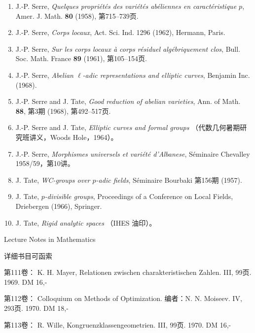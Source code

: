 \begin{enumerate}
{  groups}, Amer. J. Math. \textbf{78}, 第2期 (1956), 第401--443页.
\item[{[25bis]}] J.-P. Serre, \emph{Quelques propri\'{e}t\'{e}s des
  vari\'{e}t\'{e}s ab\'{e}liennes en caract\'{e}ristique $p$}, Amer. J.
  Math. \textbf{80} (1958), 第715--739页.
\item[{[26]}] J.-P. Serre, \emph{Corps locaux}, Act. Sci. Ind. 1296
  (1962), Hermann, Paris.
\item[{[27]}] J.-P. Serre, \emph{Sur les corps locaux \`{a} corps
  r\'{e}siduel alg\'{e}briquement clos}, Bull. Soc. Math. France
  \textbf{89} (1961), 第105--154页.
\item[{[28]}] J.-P. Serre, \emph{Abelian $\ell$-adic representations and
  elliptic curves}, Benjamin Inc. (1968).
\item[{[29]}] J.-P. Serre and J. Tate, \emph{Good reduction of abelian
  varieties}, Ann. of Math. \textbf{88}, 第3期 (1968), 第492--517页.
\item[{[30]}] J.-P. Serre and J. Tate, \emph{Elliptic curves and formal
  groups} （代数几何暑期研究班讲义，Woods Hole，1964）。
\item[{[31]}] J.-P. Serre, \emph{Morphismes universels et vari\'{e}t\'{e}
  d'Albanese}, S\'{e}minaire Chevalley 1958/59，第10讲。
\item[{[32]}] J. Tate, \emph{WC-groups over $p$-adic fields}, S\'{e}minaire
  Bourbaki 第156期 (1957).
\item[{[33]}] J. Tate, \emph{$p$-divisible groups}, Proceedings of a
  Conference on Local Fields, Driebergen (1966), Springer.
\item[{[34]}] J. Tate, \emph{Rigid analytic spaces} （IHES 油印）。
\end{enumerate}



\clearpage
\begingroup
\small
\sloppy
Lecture Notes in Mathematics


详细书目可函索

第111卷： K. H. Mayer, Relationen zwischen charakteristischen Zahlen. III, 99页. 1969. DM 16,-

第112卷： Colloquium on Methods of Optimization. 编者：N. N. Moiseev. IV, 293页. 1970. DM 18,-

第113卷： R. Wille, Kongruenzklassengeometrien. III, 99页. 1970. DM 16,-

